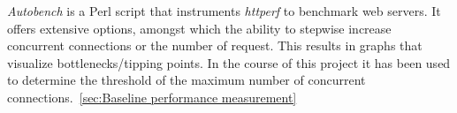 \emph{Autobench} is a Perl script that instruments \emph{httperf} to benchmark web servers. It offers extensive options, amongst which the ability to stepwise increase concurrent connections or the number of request. This results in graphs that visualize bottlenecks/tipping points. In the course of this project it has been used to determine the threshold of the maximum number of concurrent connections.~\ref{sec:Baseline performance measurement}
